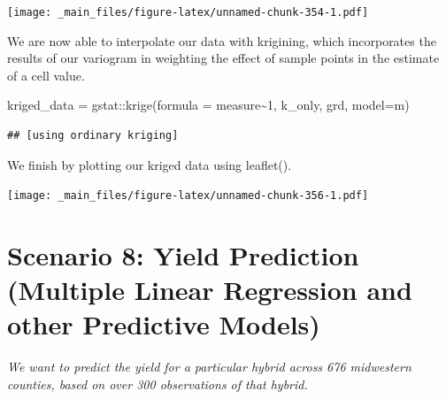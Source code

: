 \documentclass[
]{book}
\newenvironment{Shaded}{\begin{snugshade}}{\end{snugshade}}
\newcommand{\AttributeTok}[1]{\textcolor[rgb]{0.77,0.63,0.00}{#1}}
\newcommand{\DecValTok}[1]{\textcolor[rgb]{0.00,0.00,0.81}{#1}}
\newcommand{\FloatTok}[1]{\textcolor[rgb]{0.00,0.00,0.81}{#1}}
\newcommand{\FunctionTok}[1]{\textcolor[rgb]{0.00,0.00,0.00}{#1}}
\newcommand{\NormalTok}[1]{#1}
\newcommand{\OtherTok}[1]{\textcolor[rgb]{0.56,0.35,0.01}{#1}}
\newcommand{\SpecialCharTok}[1]{\textcolor[rgb]{0.00,0.00,0.00}{#1}}
\newcommand{\StringTok}[1]{\textcolor[rgb]{0.31,0.60,0.02}{#1}}
\begin{document}
\texttt{[image: \_main\_files/figure-latex/unnamed-chunk-354-1.pdf]}

We are now able to interpolate our data with krigining, which incorporates the results of our variogram in weighting the effect of sample points in the estimate of a cell value.

\begin{Shaded}
\begin{Highlighting}[]
\NormalTok{kriged\_data }\OtherTok{=}\NormalTok{ gstat}\SpecialCharTok{::}\FunctionTok{krige}\NormalTok{(}\AttributeTok{formula =}\NormalTok{ measure}\SpecialCharTok{\textasciitilde{}}\DecValTok{1}\NormalTok{, k\_only, grd, }\AttributeTok{model=}\NormalTok{m)}
\end{Highlighting}
\end{Shaded}

\begin{verbatim}
## [using ordinary kriging]
\end{verbatim}

We finish by plotting our kriged data using leaflet().

\begin{Shaded}
\end{Shaded}

\texttt{[image: \_main\_files/figure-latex/unnamed-chunk-356-1.pdf]}

\hypertarget{scenario-8-yield-prediction-multiple-linear-regression-and-other-predictive-models}{%
\section{Scenario 8: Yield Prediction (Multiple Linear Regression and other Predictive Models)}\label{scenario-8-yield-prediction-multiple-linear-regression-and-other-predictive-models}}

\emph{We want to predict the yield for a particular hybrid across 676 midwestern counties, based on over 300 observations of that hybrid.}
\end{document}
